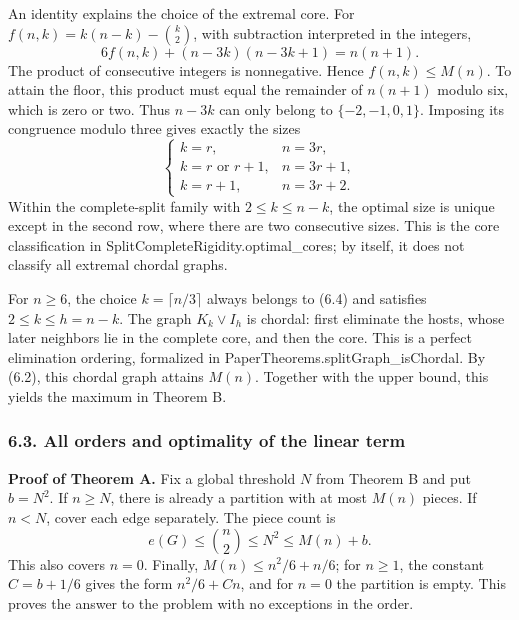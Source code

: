 \documentclass[english,11pt,a4paper]{article}
\begin{document}
An identity explains the choice of the extremal core. For \(f(n,k)=k(n-k)-\binom k2\), with subtraction interpreted in the integers, \[
6f(n,k)+(n-3k)(n-3k+1)=n(n+1).
\tag{6.3}
\] The product of consecutive integers is nonnegative. Hence \(f(n,k)\le M(n)\). To attain the floor, this product must equal the remainder of \(n(n+1)\) modulo six, which is zero or two. Thus \(n-3k\) can only belong to \(\{-2,-1,0,1\}\). Imposing its congruence modulo three gives exactly the sizes \[
\begin{cases}
k=r,& n=3r,\\
k=r\text{ or }r+1,& n=3r+1,\\
k=r+1,& n=3r+2.
\end{cases}
\tag{6.4}
\] Within the complete-split family with \(2\le k\le n-k\), the optimal size is unique except in the second row, where there are two consecutive sizes. This is the core classification in {\ttfamily\small SplitComplet\discretionary{\hbox{\ensuremath{\hookrightarrow}}}{}{}eRigidity.\discretionary{\hbox{\ensuremath{\hookrightarrow}}}{}{}optimal\_\discretionary{\hbox{\ensuremath{\hookrightarrow}}}{}{}cores}; by itself, it does not classify all extremal chordal graphs.

For \(n\ge6\), the choice \(k=\lceil n/3\rceil\) always belongs to (6.4) and satisfies \(2\le k\le h=n-k\). The graph \(K_k\vee I_h\) is chordal: first eliminate the hosts, whose later neighbors lie in the complete core, and then the core. This is a perfect elimination ordering, formalized in {\ttfamily\small PaperTheorem\discretionary{\hbox{\ensuremath{\hookrightarrow}}}{}{}s.\discretionary{\hbox{\ensuremath{\hookrightarrow}}}{}{}splitGraph\_\discretionary{\hbox{\ensuremath{\hookrightarrow}}}{}{}isChordal}. By (6.2), this chordal graph attains \(M(n)\). Together with the upper bound, this yields the maximum in Theorem B.

\subsubsection{6.3. All orders and optimality of the linear term}\label{all-orders-and-optimality-of-the-linear-term}

\textbf{Proof of Theorem A.} Fix a global threshold \(N\) from Theorem B and put \(b=N^2\). If \(n\ge N\), there is already a partition with at most \(M(n)\) pieces. If \(n<N\), cover each edge separately. The piece count is \[
e(G)\le\binom n2\le N^2\le M(n)+b.
\] This also covers \(n=0\). Finally, \(M(n)\le n^2/6+n/6\); for \(n\ge1\), the constant \(C=b+1/6\) gives the form \(n^2/6+Cn\), and for \(n=0\) the partition is empty. This proves the answer to the problem with no exceptions in the order.
\end{document}
